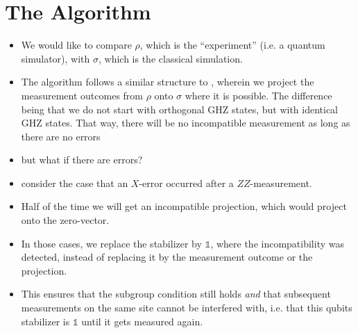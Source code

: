 \section{The Algorithm}
\begin{itemize}
  \item We would like to compare $\rho$, which is the \enquote{experiment}
    (i.e. a quantum simulator), with $\sigma$, which is the classical
    simulation.
  \item The algorithm follows a similar structure to
    \cite{liCrossEntropyBenchmark2023}, wherein we project the measurement
    outcomes from $\rho$ onto $\sigma$ where it is possible. The difference
    being that we do not start with orthogonal GHZ states, but with identical
    GHZ states. That way, there will be no incompatible measurement as long as
    there are no errors
  \item but what if there are errors?
  \item consider the case that an $X$-error occurred after a $ZZ$-measurement.
  \item Half of the time we will get an incompatible projection, which would
    project onto the zero-vector.
  \item In those cases, we replace the stabilizer by $\mathds{1}$, where the
    incompatibility was detected, instead of replacing it by the measurement
    outcome or the projection.
  \item This ensures that the subgroup condition still holds \emph{and} that
    subsequent measurements on the same site cannot be interfered with, i.e.
    that this qubits stabilizer is $\mathds{1}$ until it gets measured again.
\end{itemize}

\clearpage
